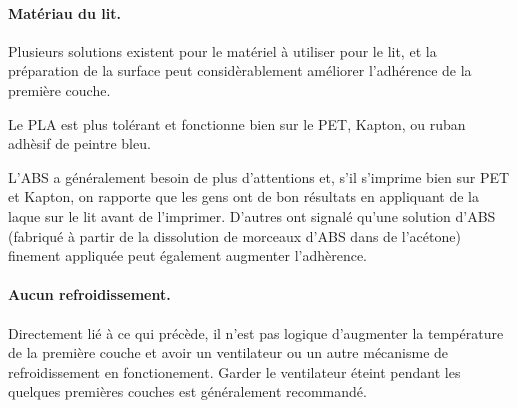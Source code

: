 \paragraph{Matériau du lit.} %
\label{par:bed_material}
Plusieurs solutions existent pour le matériel à utiliser pour le lit, et la préparation de la surface peut considèrablement améliorer l'adhérence de la première couche.

Le PLA est plus tolérant et fonctionne bien sur le PET, Kapton, ou ruban adhèsif de peintre bleu.


L'ABS a généralement besoin de plus d'attentions et, s'il s'imprime bien sur PET et Kapton, on rapporte que les gens ont de bon résultats en appliquant de la laque sur le lit avant de l'imprimer. D'autres ont signalé qu'une solution d'ABS (fabriqué à partir de la dissolution de morceaux d'ABS dans de l'acétone) finement appliquée peut également augmenter l'adhèrence.

\paragraph{Aucun refroidissement.} %
\label{par:no_cooling}
Directement lié à ce qui précède, il n'est pas logique d'augmenter la température de la première couche et avoir un ventilateur ou un autre mécanisme de refroidissement en fonctionement. Garder le ventilateur éteint pendant les quelques premières couches est généralement recommandé.
